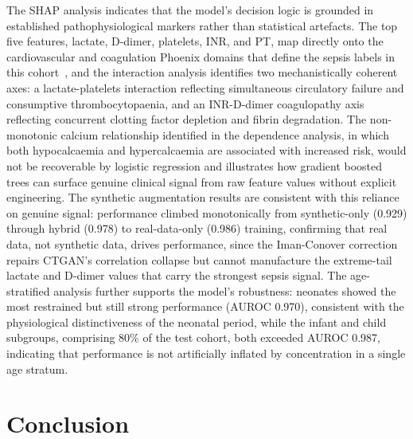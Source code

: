 \documentclass[final,3p,times]{elsarticle}
\begin{document}
The SHAP analysis indicates that the model's decision logic is grounded in
established pathophysiological markers rather than statistical artefacts.
The top five features, lactate, D-dimer, platelets, INR, and PT, map
directly onto the cardiovascular and coagulation Phoenix domains that
define the sepsis labels in this cohort~\cite{sanchezpinto2024,
schlapbach2024}, and the interaction analysis identifies two mechanistically
coherent axes: a lactate-platelets interaction reflecting simultaneous
circulatory failure and consumptive thrombocytopaenia, and an INR-D-dimer
coagulopathy axis reflecting concurrent clotting factor depletion and
fibrin degradation. The non-monotonic calcium relationship identified in
the dependence analysis, in which both hypocalcaemia and hypercalcaemia are
associated with increased risk, would not be recoverable by logistic
regression and illustrates how gradient boosted trees can surface genuine
clinical signal from raw feature values without explicit engineering. The
synthetic augmentation results are consistent with this reliance on
genuine signal: performance climbed monotonically from synthetic-only
(0.929) through hybrid (0.978) to real-data-only (0.986) training,
confirming that real data, not synthetic data, drives performance, since
the Iman-Conover correction repairs CTGAN's correlation collapse but
cannot manufacture the extreme-tail lactate and D-dimer values that carry
the strongest sepsis signal. The age-stratified analysis further supports
the model's robustness: neonates showed the most restrained but still
strong performance (AUROC 0.970), consistent with the physiological
distinctiveness of the neonatal period, while the infant and child
subgroups, comprising 80\% of the test cohort, both exceeded AUROC 0.987,
indicating that performance is not artificially inflated by concentration
in a single age stratum.



\section{Conclusion}
\label{sec:conclusion}
\end{document}
